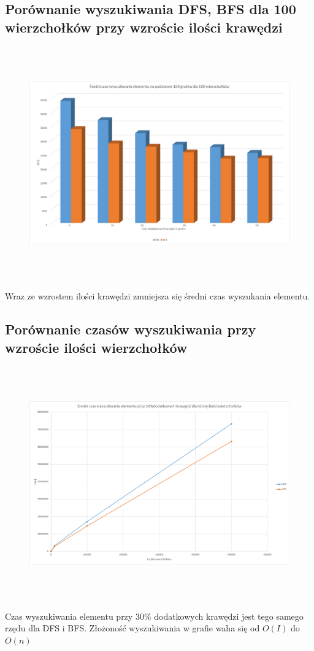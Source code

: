 \documentclass[a4paper,11pt]{article}
\begin{document}
\subsection{Porównanie wyszukiwania DFS, BFS dla 100 wierzchołków przy wzroście ilości krawędzi}
\begin{center}
\begin{figure}[h!]
\includegraphics[width=12.5cm,height=10cm]{Wykresy2/100Wierzcholkow}
\label{fig:obrazek Wykresy2/WszystkieElementyWyszukaj}
\end{figure}
\end{center}
Wraz ze wzrostem ilości krawędzi zmniejsza się średni czas wyszukania elementu.
\newpage
\subsection{Porównanie czasów wyszukiwania przy wzroście ilości wierzchołków}
\begin{center}
\begin{figure}[h!]
\includegraphics[width=12.5cm,height=10cm]{Wykresy2/Wykres}
\end{figure}
\end{center}
Czas wyszukiwania elementu przy 30\% dodatkowych krawędzi jest tego samego rzędu dla DFS i BFS.
Złożoność wyszukiwania w grafie waha się od
$O(I)
$
do
$O(n)
$
\newpage
\end{document}
